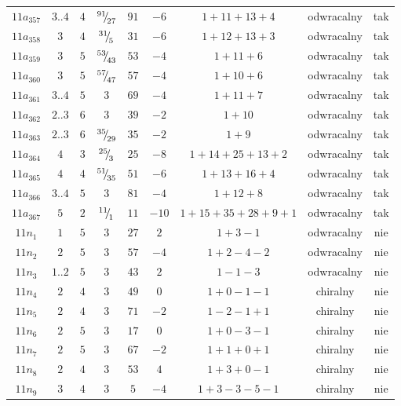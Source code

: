 \begin{longtable}{ccccccccc}
$11a_{357}$ & $3..4$ & $4$ & ${}^{91}{\mskip -5mu/\mskip -3mu}_{27}$ & $91$ & $-6$ & $1+11+13+4$ & odwracalny & tak \\
$11a_{358}$ & $3$ & $4$ & ${}^{31}{\mskip -5mu/\mskip -3mu}_{5}$ & $31$ & $-6$ & $1+12+13+3$ & odwracalny & tak \\
$11a_{359}$ & $3$ & $5$ & ${}^{53}{\mskip -5mu/\mskip -3mu}_{43}$ & $53$ & $-4$ & $1+11+6$ & odwracalny & tak \\
$11a_{360}$ & $3$ & $5$ & ${}^{57}{\mskip -5mu/\mskip -3mu}_{47}$ & $57$ & $-4$ & $1+10+6$ & odwracalny & tak \\
$11a_{361}$ & $3..4$ & $5$ & $3$ & $69$ & $-4$ & $1+11+7$ & odwracalny & tak \\
$11a_{362}$ & $2..3$ & $6$ & $3$ & $39$ & $-2$ & $1+10$ & odwracalny & tak \\
$11a_{363}$ & $2..3$ & $6$ & ${}^{35}{\mskip -5mu/\mskip -3mu}_{29}$ & $35$ & $-2$ & $1+9$ & odwracalny & tak \\
$11a_{364}$ & $4$ & $3$ & ${}^{25}{\mskip -5mu/\mskip -3mu}_{3}$ & $25$ & $-8$ & $1+14+25+13+2$ & odwracalny & tak \\
$11a_{365}$ & $4$ & $4$ & ${}^{51}{\mskip -5mu/\mskip -3mu}_{35}$ & $51$ & $-6$ & $1+13+16+4$ & odwracalny & tak \\
$11a_{366}$ & $3..4$ & $5$ & $3$ & $81$ & $-4$ & $1+12+8$ & odwracalny & tak \\
$11a_{367}$ & $5$ & $2$ & ${}^{11}{\mskip -5mu/\mskip -3mu}_{1}$ & $11$ & $-10$ & $1+15+35+28+9+1$ & odwracalny & tak \\
$11n_{1}$ & $1$ & $5$ & $3$ & $27$ & $2$ & $1+3-1$ & odwracalny & nie \\
$11n_{2}$ & $2$ & $5$ & $3$ & $57$ & $-4$ & $1+2-4-2$ & odwracalny & nie \\
$11n_{3}$ & $1..2$ & $5$ & $3$ & $43$ & $2$ & $1-1-3$ & odwracalny & nie \\
$11n_{4}$ & $2$ & $4$ & $3$ & $49$ & $0$ & $1+0-1-1$ & chiralny & nie \\
$11n_{5}$ & $2$ & $4$ & $3$ & $71$ & $-2$ & $1-2-1+1$ & chiralny & nie \\
$11n_{6}$ & $2$ & $5$ & $3$ & $17$ & $0$ & $1+0-3-1$ & chiralny & nie \\
$11n_{7}$ & $2$ & $5$ & $3$ & $67$ & $-2$ & $1+1+0+1$ & chiralny & nie \\
$11n_{8}$ & $2$ & $4$ & $3$ & $53$ & $4$ & $1+3+0-1$ & chiralny & nie \\
$11n_{9}$ & $3$ & $4$ & $3$ & $5$ & $-4$ & $1+3-3-5-1$ & chiralny & nie \\

\end{longtable}
